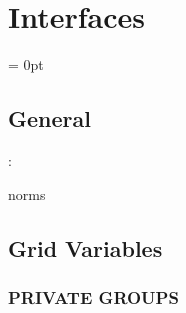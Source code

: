 
\section{Interfaces} 


\parskip = 0pt

\vspace{3mm} \subsection*{General}

: 

norms
\vspace{2mm}
\subsection*{Grid Variables}
\vspace{5mm}\subsubsection{PRIVATE GROUPS}

\vspace{5mm}

